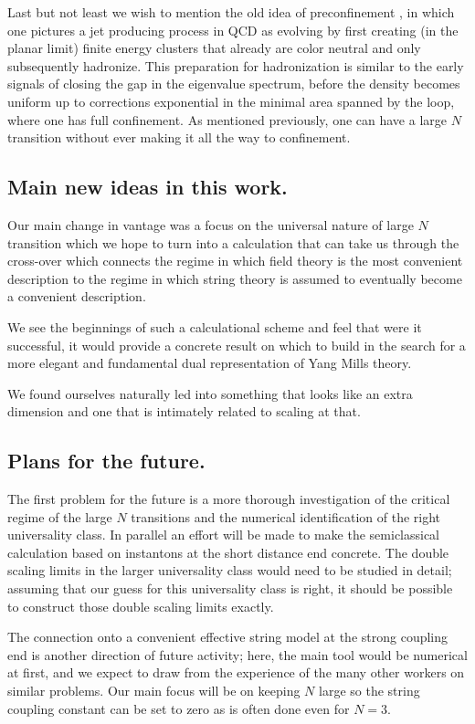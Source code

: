 Last but not least we wish to mention the old idea of
preconfinement \cite{amativ16}, in which one pictures a jet
producing process in QCD as evolving by first creating (in the
planar limit) finite energy clusters that already are color
neutral and only subsequently hadronize. This preparation for
hadronization is similar to the early signals of closing the gap
in the eigenvalue spectrum, before the density becomes uniform up
to corrections exponential in the minimal area spanned by the
loop, where one has full confinement. As mentioned previously, one
can have a large $N$ transition without ever making it all the way
to confinement.

\subsection{Main new ideas in this work.}

Our main change in vantage was a focus on the universal nature of
large $N$ transition which we hope to turn into a calculation that
can take us through the cross-over which connects the regime in
which field theory is the most convenient description to the
regime in which string theory is assumed to eventually become a
convenient description.

We see the beginnings of such a calculational scheme and feel that
were it successful, it would provide a concrete result on which to
build in the search for a more elegant and fundamental dual
representation of Yang Mills theory.

We found ourselves naturally led into something that looks like an
extra dimension and one that is intimately related to scaling at
that.


\subsection{Plans for the future.}

The first problem for the future is a more thorough investigation
of the critical regime of the large $N$ transitions and the
numerical identification of the right universality class. In
parallel an effort will be made to make the semiclassical
calculation based on instantons at the short distance end
concrete. The double scaling limits in the larger universality
class would need to be studied in detail; assuming that our guess
for this universality class is right, it should be possible to
construct those double scaling limits exactly.

The connection onto a convenient effective string model at the
strong coupling end is another direction of future activity; here,
the main tool would be numerical at first, and we expect to draw
from the experience of the many other workers on similar problems.
Our main focus will be on keeping $N$ large so the string coupling
constant can be set to zero as is often done even for $N=3$.

